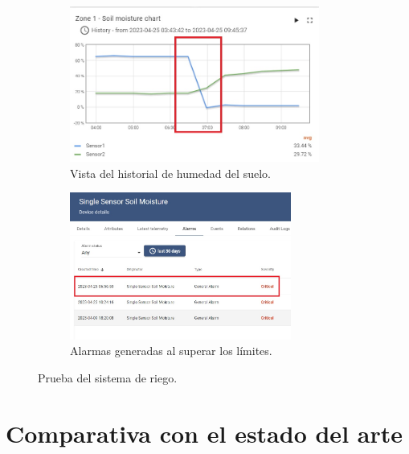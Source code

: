 \begin{figure}[!h]
     \centering
       \begin{subfigure}[b]{0.8\textwidth}
	    \centering
		 \includegraphics[width=0.9\textwidth]{./Figures/chapter4/soil_chart.jpg}
		\caption{Vista del historial de humedad del suelo.}
		\label{fig:soil_graph}
     \end{subfigure}
          \hfill
     \begin{subfigure}[b]{0.80\textwidth}
		\centering
		\includegraphics[width=0.80\textwidth]{./Figures/chapter4/soil_alarm.jpg}
		\caption{Alarmas generadas al superar los límites.}
		\label{fig:soil_alarm}
     \end{subfigure}
     \hfill
        \caption[Prueba del sistema de riego]{Prueba del sistema de riego.}
        \label{fig:tb_riego}
\end{figure}

\pagebreak
\section{Comparativa con el estado del arte}
\label{sec:Comparativa con el estado del arte}

